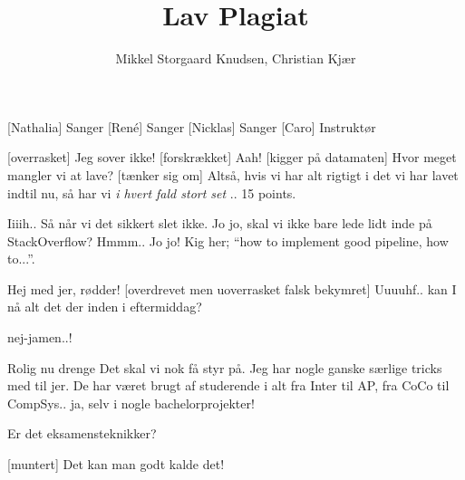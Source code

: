 \documentclass[a4paper,11pt]{article}
\title{Lav Plagiat}
\author{Mikkel Storgaard Knudsen, Christian Kjær}
\begin{document}
\maketitle

\begin{props}
\end{props}

\begin{roles}
[Nathalia] Sanger
[René] Sanger
[Nicklas] Sanger
[Caro] Instruktør
\end{roles}

\begin{sketch}


  [overrasket] Jeg sover ikke!
  [forskrækket] Aah!
  [kigger på datamaten] Hvor meget mangler vi at lave?
  [tænker sig om] Altså, hvis vi har alt rigtigt i det vi har lavet
  indtil nu, så har vi \emph{i hvert fald stort set} .. 15 points.
  
   Iiiih.. Så når vi det sikkert slet ikke.
   Jo jo, skal vi ikke bare lede lidt inde på StackOverflow?
   Hmmm..
   Jo jo! Kig her;  ``how to implement good pipeline,
  how to...''. 


   Hej med jer, rødder!
  [overdrevet men uoverrasket falsk bekymret] Uuuuhf.. kan I nå alt det
  der inden  i eftermiddag?

   nej-jamen..!

   Rolig nu drenge  Det skal vi nok få styr på.
  Jeg har nogle ganske særlige tricks med til jer.
  De har været brugt af studerende i alt fra Inter til AP, fra CoCo til
  CompSys.. ja, selv i nogle bachelorprojekter! 

   Er det eksamensteknikker?

  [muntert] Det kan man godt kalde det!
\end{sketch}
  
\end{document}
